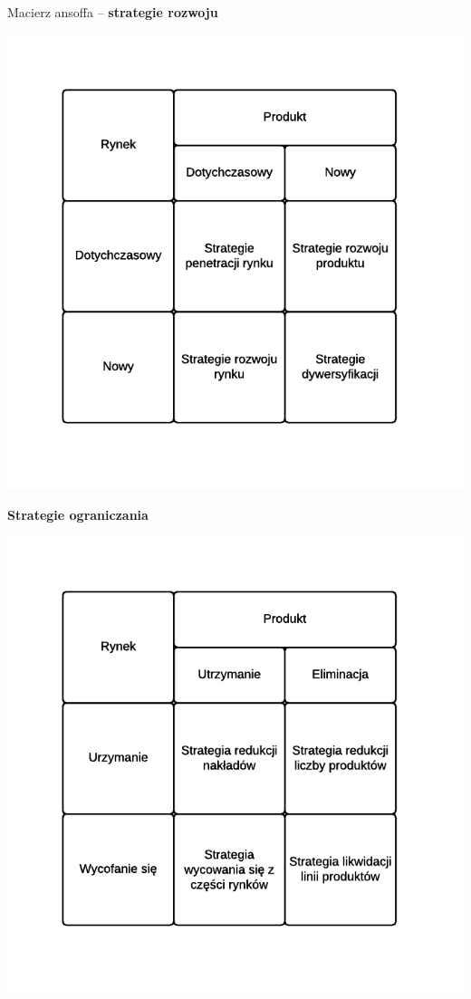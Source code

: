 \documentclass[a4paper,10pt]{report}
\begin{document}
Macierz ansoffa -- \textbf{strategie rozwoju}
\begin{center}
\includegraphics[scale=0.82]{assets/Ansoff}
\end{center}

\textbf{Strategie ograniczania}
\begin{center}
\includegraphics[scale=0.82]{assets/Ansoff2}
\end{center}
\end{document}
